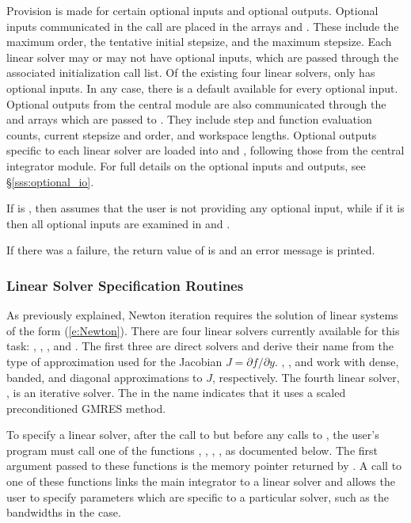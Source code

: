 Provision is made for certain optional inputs and optional outputs.
Optional inputs communicated in the  call are placed
in the arrays  and .  These include the maximum
order, the tentative initial stepsize, and the maximum stepsize.  Each
{\cvode} linear solver may or may not have optional inputs, which are
passed through the associated initialization call list.  Of the existing four
linear solvers, only {\cvspgmr} has optional inputs.  In any case, there
is a default available for every optional input.  Optional outputs
from the central {\cvode} module are also communicated through the
 and  arrays which are passed to .
They include step and function evaluation counts, current stepsize and
order, and workspace lengths.  Optional outputs
specific to each linear solver are loaded into  and
, following those from the central integrator module.
For full details on the optional inputs and outputs, see
\S\ref{sss:optional_io}.

If  is , then {\cvode} assumes that the user is not providing
any optional input, while if it is  then all optional inputs 
are examined in  and . 

If there was a failure, the return value of  is  and
an error message is printed.

\subsubsection{Linear Solver Specification Routines}\label{sss:lin_solv_init}

As previously explained, Newton iteration requires the solution of
linear systems of the form (\ref{e:Newton}).  There are four {\cvode} linear
solvers currently available for this task: {\cvdense}, {\cvband}, {\cvdiag},
and {\cvspgmr}.  The first three are direct solvers and derive their name
from the type of approximation used for the Jacobian 
$J = \partial{f}/\partial{y}$.  {\cvdense}, {\cvband}, and {\cvdiag} work with
dense, banded, and diagonal approximations to $J$, respectively.  The
fourth {\cvode} linear solver, {\cvspgmr}, is an iterative solver.  The {\spgmr}
in the name indicates that it uses a scaled preconditioned
GMRES method.

To specify a {\cvode} linear solver, after the call to 
but before any calls to , the user's program must call one
of the functions , , , ,
as documented below. The first argument passed to these functions is the {\cvode}
memory pointer returned by .  A call to one of these
functions links the main {\cvode} integrator to a linear solver and
allows the user to specify parameters which are specific to a
particular solver, such as the bandwidths in the {\cvband} case.

